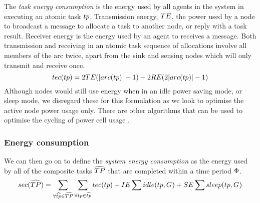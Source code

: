 \newcommand{\functionTaskEnergyConsumption}[2]{
	\functionSignature{tec}
	{\varAtomicTask{}{}}
}
The \textit{task energy consumption} is the energy used by all agents in the system in executing an atomic task $\varAtomicTask{}{}$. Transmission energy, $TE$, the power used by a node to  broadcast a message to allocate a task to another node, or reply with a task result. Receiver energy is the energy used by an agent to receives a message. Both transmission and receiving in an atomic task sequence of allocations involve all members of the arc twice, apart from the sink and sensing nodes which will only transmit and receive once.  
\begin{equation}
	\functionTaskEnergyConsumption{}{} 
	= 2\varTransmissionEnergy{}{} (\funcSize{\functionTaskArc{}{}}{} - 1)
	+ 2\varReceiverEnergy{}{} (2 \funcSize{\functionTaskArc{}{}}{} - 1)
\end{equation}
Although nodes would still use energy when in an idle power saving mode, or sleep mode, we disregard these for this formulation as we look to optimise the active node power usage only. There are other algorithms that can be used to optimise the cycling of power cell usage \cite{DUMMY}.
\subsubsection{Energy consumption}
\newcommand{\functionSystemEnergyConsumption}[2]{
	\functionSignature{sec}
	{\setCompositeTask{}{}}
}
We can then go on to define the \textit{system energy consumption} as the energy used by all of the composite tasks $\setCompositeTask{}{}$ that are completed within a time period $\Phi$.
\begin{equation}
	\functionSystemEnergyConsumption{}{} 
	= 
	\sum_{\forall \varCompositeTask{}{} \in \setCompositeTask{}{}}
	\sum_{\forall \varAtomicTask{}{} \in \varCompositeTask{}{}} \functionTaskEnergyConsumption{}{}
	+ \varIdleEnergy{}{} \sum \functionIdleRole{}{}
	+ \varSleepEnergy{}{} \sum \functionSleepRole{}{}
\end{equation}

